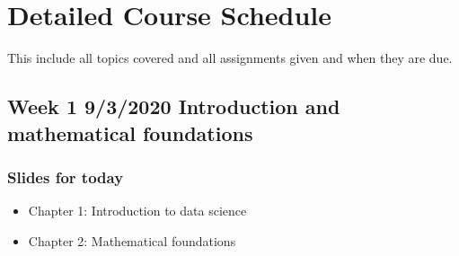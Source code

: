 \documentclass[letterpaper,10pt,english]{sphinxmanual}
\begin{document}
\chapter{Detailed Course Schedule}
\label{\detokenize{course-schedule:detailed-course-schedule}}\label{\detokenize{course-schedule::doc}}
This include all topics covered and all assignments given and when they are due.


\section{Week 1 \sphinxhyphen{} 9/3/2020 \sphinxhyphen{} Introduction and mathematical foundations}
\label{\detokenize{course-schedule:week-1-9-3-2020-introduction-and-mathematical-foundations}}

\subsection{Slides for today}
\label{\detokenize{course-schedule:slides-for-today}}\begin{itemize}
\item {} 
Chapter 1: Introduction to data science

\item {} 
Chapter 2: Mathematical foundations

\end{itemize}
\end{document}
